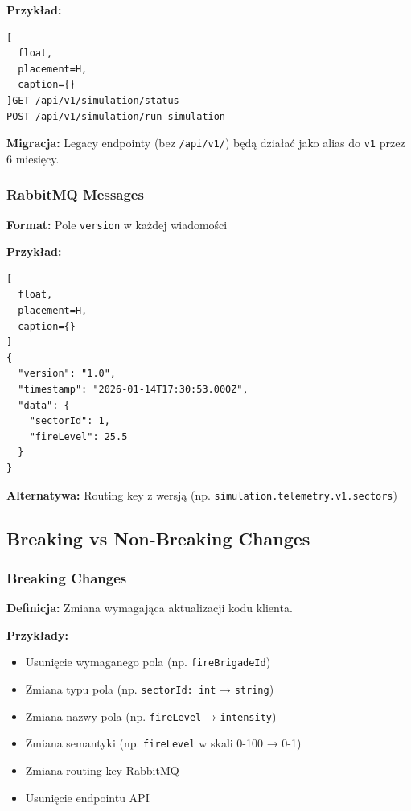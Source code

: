 \textbf{Przykład:}
\begin{lstlisting}[
  float,
  placement=H,
  caption={}
]GET /api/v1/simulation/status
POST /api/v1/simulation/run-simulation
\end{lstlisting}

\textbf{Migracja:} Legacy endpointy (bez \texttt{/api/v1/}) będą działać jako alias do \texttt{v1} przez 6 miesięcy.

\subsubsection{RabbitMQ Messages}

\textbf{Format:} Pole \texttt{version} w każdej wiadomości

\textbf{Przykład:}
\begin{lstlisting}[
  float,
  placement=H,
  caption={}
] 
{
  "version": "1.0",
  "timestamp": "2026-01-14T17:30:53.000Z",
  "data": {
    "sectorId": 1,
    "fireLevel": 25.5
  }
}
\end{lstlisting}

\textbf{Alternatywa:} Routing key z wersją (np. \texttt{simulation.telemetry.v1.sectors})

\subsection{Breaking vs Non-Breaking Changes}

\subsubsection{Breaking Changes}

\textbf{Definicja:} Zmiana wymagająca aktualizacji kodu klienta.

\textbf{Przykłady:}
\begin{itemize}
    \item Usunięcie wymaganego pola (np. \texttt{fireBrigadeId})
    \item Zmiana typu pola (np. \texttt{sectorId: int} → \texttt{string})
    \item Zmiana nazwy pola (np. \texttt{fireLevel} → \texttt{intensity})
    \item Zmiana semantyki (np. \texttt{fireLevel} w skali 0-100 → 0-1)
    \item Zmiana routing key RabbitMQ
    \item Usunięcie endpointu API
\end{itemize}

